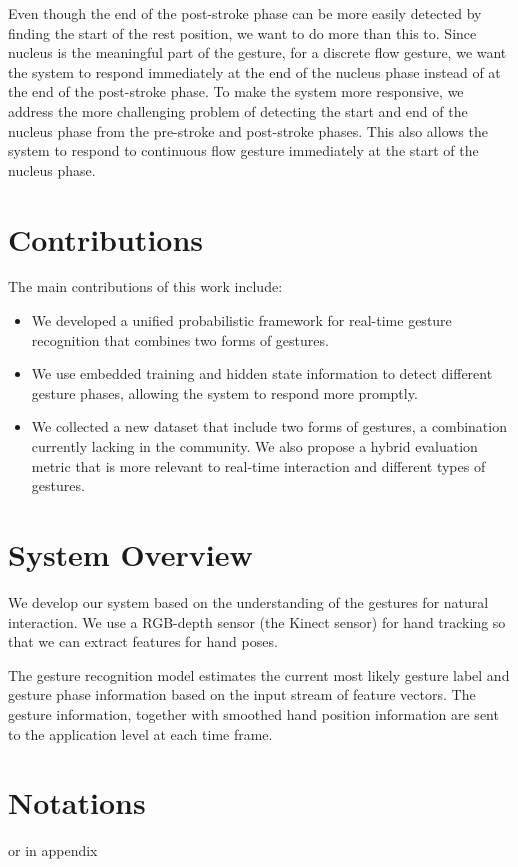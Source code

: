 Even though the end of the
post-stroke phase can be more easily detected by finding the start of the
rest position, we want to do more than this to. Since nucleus is the meaningful
part of the gesture, for a discrete flow gesture, we want the system to respond immediately at the end of the nucleus
phase instead of at the end of the post-stroke phase. To make the system more responsive,
we address the more challenging problem of detecting the start and end of the nucleus phase from the pre-stroke
and post-stroke phases. This also allows the system to respond to continuous
flow gesture immediately at the start of the nucleus phase.

\section{Contributions}
The main contributions of this work include:
\begin{itemize}
  \item We developed a unified probabilistic framework for real-time gesture
  recognition that combines two forms of gestures.
  \item We use embedded training and hidden state information to detect
  different gesture phases, allowing the system to respond more promptly.
  \item We collected a new dataset that include two forms of gestures, a
  combination currently lacking in the community. We also propose a hybrid
  evaluation metric that is more relevant to real-time interaction and different
  types of gestures.
\end{itemize}

\section{System Overview}
We develop our system based on the understanding of the gestures for
natural interaction. 
We use a RGB-depth sensor (the Kinect sensor) for hand tracking so that we can extract
features for hand poses.

The gesture recognition model estimates the current most likely gesture label
and gesture phase information based on the input stream of
feature vectors. The gesture information, 
together with smoothed hand position information are sent to the application level at each time frame.

\section{Notations}
or in appendix

